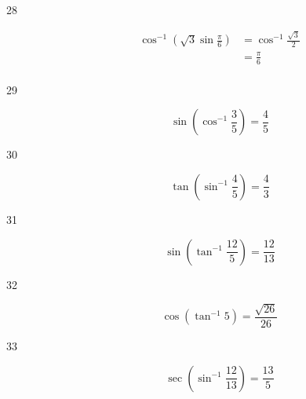 \documentclass{exam}
\begin{document}
\begin{description}
      \item[28] 
        \begin{align*}
          \cos^{-1} \left( \sqrt{3} \sin \frac{\pi}{6} \right) & = \cos^{-1} \frac{\sqrt{3}}{2} \\
                                                               & = \boxed{ \frac{\pi}{6} } \\
        \end{align*}

      \item[29]
        \[
          \sin \left( \cos^{-1} \frac{3}{5} \right) = \boxed{ \frac{4}{5} } 
        \]

      \item[30]
        \[
          \tan \left( \sin^{-1} \frac{4}{5} \right) = \boxed{ \frac{4}{3} } 
        \]

      \item[31]
        \[
          \sin \left( \tan^{-1} \frac{12}{5} \right) = \boxed{ \frac{12}{13} } 
        \]

      \item[32]
        \[
          \cos \left( \tan^{-1} 5 \right) = \boxed{ \frac{\sqrt{26}}{26} } 
        \]

      \item[33]
        \[
          \sec \left( \sin^{-1} \frac{12}{13} \right) = \boxed{ \frac{13}{5} } 
        \]




\end{description}
\end{document}
